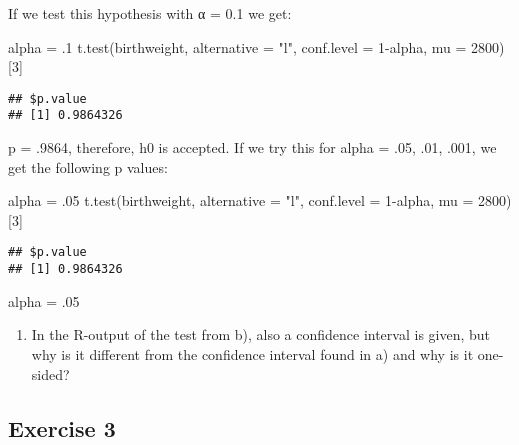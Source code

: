 \documentclass[
]{article}
\newenvironment{Shaded}{\begin{snugshade}}{\end{snugshade}}
\newcommand{\AttributeTok}[1]{\textcolor[rgb]{0.77,0.63,0.00}{#1}}
\newcommand{\DecValTok}[1]{\textcolor[rgb]{0.00,0.00,0.81}{#1}}
\newcommand{\FunctionTok}[1]{\textcolor[rgb]{0.00,0.00,0.00}{#1}}
\newcommand{\NormalTok}[1]{#1}
\newcommand{\OtherTok}[1]{\textcolor[rgb]{0.56,0.35,0.01}{#1}}
\newcommand{\SpecialCharTok}[1]{\textcolor[rgb]{0.00,0.00,0.00}{#1}}
\newcommand{\StringTok}[1]{\textcolor[rgb]{0.31,0.60,0.02}{#1}}
\providecommand{\tightlist}{%
  \setlength{\itemsep}{0pt}\setlength{\parskip}{0pt}}
\begin{document}
If we test this hypothesis with α = 0.1 we get:

\begin{Shaded}
\begin{Highlighting}[]
\NormalTok{alpha }\OtherTok{=}\NormalTok{ .}\DecValTok{1}
\FunctionTok{t.test}\NormalTok{(birthweight, }\AttributeTok{alternative =} \StringTok{"l"}\NormalTok{, }\AttributeTok{conf.level =} \DecValTok{1}\SpecialCharTok{{-}}\NormalTok{alpha, }\AttributeTok{mu =} \DecValTok{2800}\NormalTok{)[}\DecValTok{3}\NormalTok{]}
\end{Highlighting}
\end{Shaded}

\begin{verbatim}
## $p.value
## [1] 0.9864326
\end{verbatim}

p = .9864, therefore, h0 is accepted. If we try this for alpha = .05,
.01, .001, we get the following p values:

\begin{Shaded}
\begin{Highlighting}[]
\NormalTok{alpha }\OtherTok{=}\NormalTok{ .}\DecValTok{05}
\FunctionTok{t.test}\NormalTok{(birthweight, }\AttributeTok{alternative =} \StringTok{"l"}\NormalTok{, }\AttributeTok{conf.level =} \DecValTok{1}\SpecialCharTok{{-}}\NormalTok{alpha, }\AttributeTok{mu =} \DecValTok{2800}\NormalTok{)[}\DecValTok{3}\NormalTok{]}
\end{Highlighting}
\end{Shaded}

\begin{verbatim}
## $p.value
## [1] 0.9864326
\end{verbatim}

\begin{Shaded}
\begin{Highlighting}[]
\NormalTok{alpha }\OtherTok{=}\NormalTok{ .}\DecValTok{05}
\end{Highlighting}
\end{Shaded}

\begin{enumerate}
\def\labelenumi{\alph{enumi})}
\setcounter{enumi}{2}
\tightlist
\item
  In the R-output of the test from b), also a confidence interval is
  given, but why is it different from the confidence interval found in
  a) and why is it one-sided?
\end{enumerate}

\hypertarget{exercise-3}{%
\subsection{Exercise 3}\label{exercise-3}}
\end{document}
